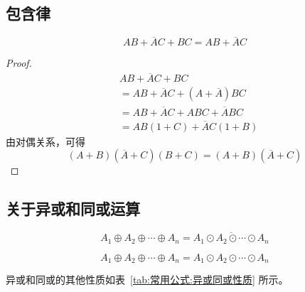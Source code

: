 \subsection{包含律}
\label{sec:包含律}

\begin{theorem}[包含律]
	\begin{equation}
		AB+\overline{A}C+BC=AB+\overline{A}C
		\label{eq:常用公式:包含律}
	\end{equation}
\end{theorem}

\begin{proof}
	\begin{equation}
		\begin{aligned}
			&AB+\overline{A}C+BC \\
			&=AB+\overline{A}C+(A+\overline{A})BC \\
			&=AB+\overline{A}C+ABC+\overline{A}BC \\
			&=AB(1+C)+\overline{A}C(1+B)
		\end{aligned}
	\end{equation}
	由对偶关系，可得
	\begin{equation}
		(A+B)(\overline{A}+C)(B+C)=(A+B)(\overline{A}+C)
	\end{equation}
\end{proof}

\subsection{关于异或和同或运算}
\label{sec:关于异或和同或运算}

\begin{property}[对偶数个变量]
	\begin{equation}
		A_1\oplus A_2\oplus\cdots\oplus A_n
		=\overline{A_1\odot A_2\odot\cdots\odot A_n}
		\label{eq:常用公式:异或同或:偶数个变量}
	\end{equation}
\end{property}

\begin{property}[对奇数个变量]
	\begin{equation}
		A_1\oplus A_2\oplus\cdots\oplus A_n
		=A_1\odot A_2\odot\cdots\odot A_n
		\label{eq:常用公式:异或同或:奇数个变量}
	\end{equation}
\end{property}

异或和同或的其他性质如表~\ref{tab:常用公式:异或同或性质} 所示。

